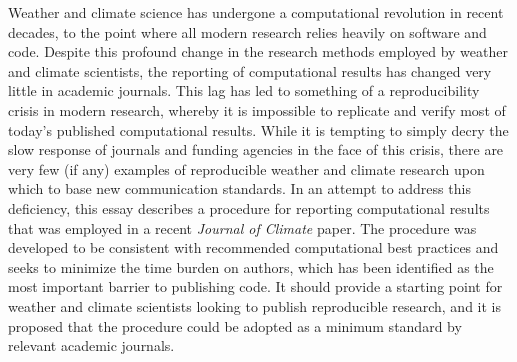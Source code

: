 Weather and climate science has undergone a computational revolution in recent decades, to the point where all modern research relies heavily on software and code. Despite this profound change in the research methods employed by weather and climate scientists, the reporting of computational results has changed very little in academic journals. This lag has led to something of a reproducibility crisis in modern research, whereby it is impossible to replicate and verify most of today's published computational results. While it is tempting to simply decry the slow response of journals and funding agencies in the face of this crisis, there are very few (if any) examples of reproducible weather and climate research upon which to base new communication standards. In an attempt to address this deficiency, this essay describes a procedure for reporting computational results that was employed in a recent \textit{Journal of Climate} paper. The procedure was developed to be consistent with recommended computational best practices and seeks to minimize the time burden on authors, which has been identified as the most important barrier to publishing code. It should provide a starting point for weather and climate scientists looking to publish reproducible research, and it is proposed that the procedure could be adopted as a minimum standard by relevant academic journals.

  
  